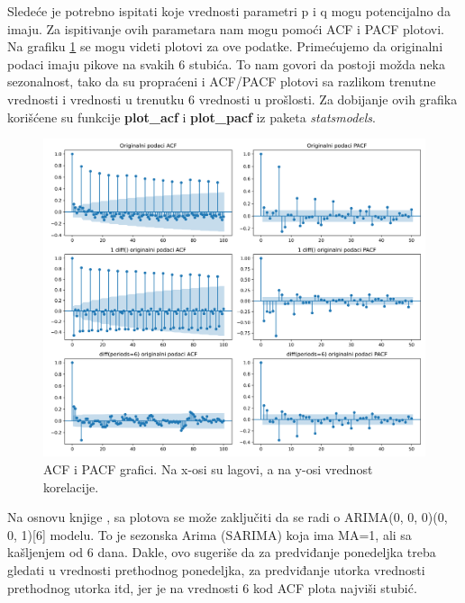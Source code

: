 \documentclass[12pt,oneside]{memoir}
\begin{document}
Sledeće je potrebno ispitati koje vrednosti parametri p i q mogu potencijalno da imaju. Za ispitivanje ovih parametara nam mogu pomoći ACF i PACF plotovi. Na grafiku \ref{fig: acf_pacf_dnevni} se mogu videti plotovi za ove podatke. Primećujemo da originalni podaci imaju pikove na svakih 6 stubića. To nam govori da postoji možda neka sezonalnost, tako da su propraćeni i ACF/PACF plotovi sa razlikom trenutne vrednosti i vrednosti u trenutku 6 vrednosti u prošlosti. Za dobijanje ovih grafika korišćene su funkcije \textbf{plot\_acf} i \textbf{plot\_pacf} iz paketa \textit{statsmodels}.

\begin{figure}[!ht]
  \centering
  \includegraphics[width=1\textwidth]{./grafici/acf_pacf_dnevni.png}
  \caption{ACF i PACF grafici. Na x-osi su lagovi, a na y-osi vrednost korelacije.}
  \label{fig: acf_pacf_dnevni}
\end{figure}
Na osnovu knjige \cite{hyndman2018forecasting}, sa plotova se može zaključiti da se radi o ARIMA(0, 0, 0)(0, 0, 1)[6] modelu. To je sezonska Arima (SARIMA) koja ima MA=1, ali sa kašljenjem od 6 dana. Dakle, ovo sugeriše da za predviđanje ponedeljka treba gledati u vrednosti prethodnog ponedeljka, za predviđanje utorka vrednosti prethodnog utorka itd, jer je na vrednosti 6 kod ACF plota najviši stubić.
\end{document}
